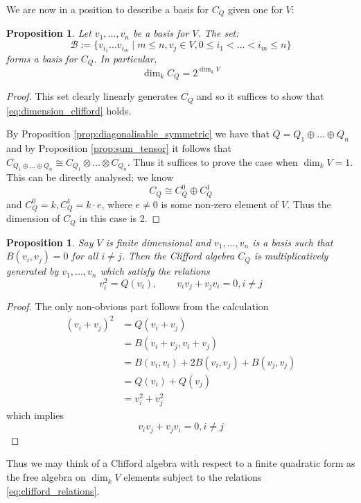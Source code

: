\documentclass[12pt]{article}
\theoremstyle{plain}
\newtheorem{proposition}[thm]{Proposition}
\theoremstyle{definition}
\newcommand{\scr}[1]{\mathscr{#1}}
\begin{document}
We are now in a position to describe a basis for $C_Q$ given one for $V$:
\begin{proposition}\label{prop:decomp_even_odd}
Let $v_1,...,v_n$ be a basis for $V$. The set:
\begin{equation}
\scr{B} := \lbrace v_{i_1}...v_{i_m} \mid m \leq n, v_{j} \in V, 0 \leq i_1 < \hdots < i_m \leq n\rbrace
\end{equation}
forms a basis for $C_Q$. In particular,
\begin{equation}\label{eq:dimension_clifford}
\operatorname{dim}_kC_Q = 2^{\operatorname{dim}_kV}
\end{equation}
\end{proposition}
\begin{proof}
This set clearly linearly generates $C_Q$ and so it suffices to show that \eqref{eq:dimension_clifford} holds.

By Proposition \ref{prop:diagonalisable_symmetric} we have that $Q = Q_1 \oplus \hdots \oplus Q_n$ and by Proposition \ref{prop:sum_tensor} it follows that $C_{Q_1 \oplus \hdots \oplus Q_n} \cong C_{Q_1} \otimes \hdots \otimes C_{Q_n}$. Thus it suffices to prove the case when $\operatorname{dim}_kV = 1$. This can be directly analysed; we know
\begin{equation}
C_Q \cong C^0_Q \oplus C^1_Q
\end{equation}
and $C^0_Q = k, C^1_Q = k\cdot e$, where $e \neq 0$ is some non-zero element of $V$. Thus the dimension of $C_Q$ in this case is 2.
\end{proof}
\begin{proposition}
Say $V$ is finite dimensional and $v_1,...,v_n$ is a basis such that $B(v_i,v_j) = 0$ for all $i \neq j$. Then the Clifford algebra $C_Q$ is multiplicatively generated by $v_1,...,v_n$ which satisfy the relations
\begin{equation}\label{eq:clifford_relations}
v_i^2 = Q(v_i),\qquad v_iv_j + v_jv_i = 0, i \neq j
\end{equation}
\end{proposition}
\begin{proof}
The only non-obvious part follows from the calculation
\begin{align*}
(v_i + v_j)^2 &= Q(v_i + v_j)\\
&= B(v_i + v_j, v_i + v_j)\\
&= B(v_i,v_i) + 2B(v_i,v_j) + B(v_j,v_j)\\
&= Q(v_i) + Q(v_j)\\
&= v_i^2 + v_j^2
\end{align*}
which implies
\begin{equation}
v_iv_j + v_jv_i = 0, i \neq j
\end{equation}
\end{proof}
Thus we may think of a Clifford algebra with respect to a finite quadratic form as the free algebra on $\operatorname{dim}_kV$ elements subject to the relations \eqref{eq:clifford_relations}.
\end{document}
